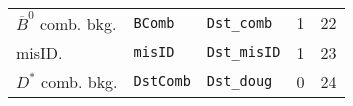 \begin{table}[!htb]
\begin{tabular}{lllrr}
 $\overline{B}^0$ comb. bkg.                                                       & \texttt{BComb}                    & \texttt{Dst\_comb}         &                     1 &               22 \\
 misID.                                                                            & \texttt{misID}                    & \texttt{Dst\_misID}        &                     1 &               23 \\
 $D^*$ comb. bkg.                                                                  & \texttt{DstComb}                  & \texttt{Dst\_doug}         &                     0 &               24 \\
\bottomrule
\end{tabular}

\end{table}
